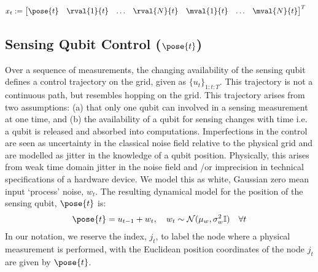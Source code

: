 \begin{align}
x_t & := \begin{bmatrix}
\pose{t} & 
\rval{1}{t} &
\hdots &
\rval{N}{t} &
\mval{1}{t} &
\hdots &
\mval{N}{t} 
\end{bmatrix}^T
\end{align}


\subsection{Sensing Qubit Control ($\pose{t}$)}
Over a sequence of measurements, the changing availability of the sensing qubit defines a control trajectory on the grid, given as $\{u_{t}\}_{1:t:T}$. This trajectory is not a continuous path, but resembles hopping on the grid. This trajectory arises from two assumptions: (a) that only one qubit can involved in a sensing measurement at one time, and (b) the availability of a qubit for sensing changes with time i.e. a qubit is released and absorbed into computations. Imperfections in the control are seen as uncertainty in the classical noise field relative to the physical grid and are modelled as jitter in the knowledge of a qubit position. Physically, this arises from weak time domain jitter in the noise field and /or imprecision in technical specifications of a hardware device. We model this as white, Gaussian zero mean input `process' noise, $w_t$. The resulting dynamical model for the position of the sensing qubit, $\pose{t}$ is:
\begin{align}
\pose{t} = u_{t-1} + w_t, \quad w_t \sim \mathcal{N}(\mu_w, \sigma_w^2 \mathbb{I}) \quad \forall t \label{eqn:physetting:1}
\end{align} In our notation, we reserve the index, $j_t$, to label the node where a physical measurement is performed, with the Euclidean position coordinates of the node $j_t$ are given by $\pose{t}$.

